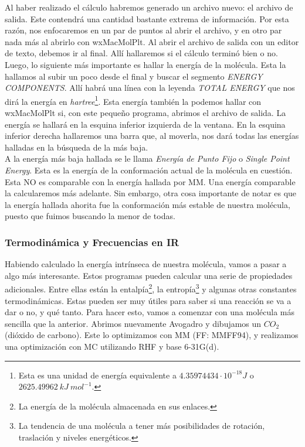 \documentclass[10pt,letterpaper]{article}
\begin{document}
Al haber realizado el c\'alculo habremos generado un archivo nuevo: el archivo de salida. Este contendr\'a una cantidad bastante extrema de informaci\'on. Por esta raz\'on, nos enfocaremos en un par de puntos al abrir el archivo, y en otro par nada m\'as al abrirlo con wxMacMolPlt. Al abrir el archivo de salida con un editor de texto, debemos ir al final. All\'i hallaremos si el c\'alculo termin\'o bien o no. Luego, lo siguiente m\'as importante es hallar la energ\'ia de la mol\'ecula. Esta la hallamos al subir un poco desde el final y buscar el segmento \textit{ENERGY COMPONENTS}. All\'i habr\'a una l\'inea con la leyenda \textit{TOTAL ENERGY} que nos dir\'a la energ\'ia en \emph{hartree}\footnote{Esta es una unidad de energ\'ia equivalente a $4.35974434 \cdot 10^{-18} J$ o $2625.49962\ kJ\ mol^{-1}$.}. Esta energ\'ia tambi\'en la podemos hallar con wxMacMolPlt si, con este peque\~no programa, abrimos el archivo de salida. La energ\'ia se hallar\'a en la esquina inferior izquierda de la ventana. En la esquina inferior derecha hallaremos una barra que, al moverla, nos dar\'a todas las energ\'ias halladas en la b\'usqueda de la m\'as baja.\\

A la energ\'ia m\'as baja hallada se le llama \emph{Energ\'ia de Punto Fijo} o \emph{Single Point Energy}. Esta es la energ\'ia de la conformaci\'on actual de la mol\'ecula en cuesti\'on. Esta NO es comparable con la energ\'ia hallada por MM. Una energ\'ia comparable la calcularemos m\'as adelante. Sin embargo, otra cosa importante de notar es que la energ\'ia hallada ahorita fue la conformaci\'on m\'as estable de nuestra mol\'ecula, puesto que fuimos buscando la menor de todas.

\subsubsection{Termodin\'amica y Frecuencias en IR}

Habiendo calculado la energ\'ia intr\'inseca de nuestra mol\'ecula, vamos a pasar a algo m\'as interesante. Estos programas pueden calcular una serie de propiedades adicionales. Entre ellas est\'an la entalp\'ia\footnote{La energ\'ia de la mol\'ecula almacenada en sus enlaces.}, la entrop\'ia\footnote{La tendencia de una mol\'ecula a tener m\'as posibilidades de rotaci\'on, traslaci\'on y niveles energ\'eticos.} y algunas otras constantes termodin\'amicas. Estas pueden ser muy \'utiles para saber si una reacci\'on se va a dar o no, y qu\'e tanto. Para hacer esto, vamos a comenzar con una mol\'ecula m\'as sencilla que la anterior. Abrimos nuevamente Avogadro y dibujamos un $CO_2$ (di\'oxido de carbono). Este lo optimizamos con MM (FF: MMFF94), y realizamos una optimizaci\'on con MC utilizando RHF y base 6-31G(d).\\
\end{document}
